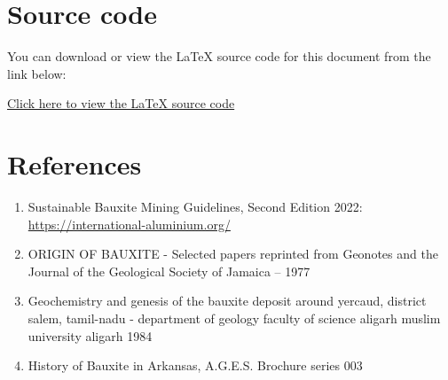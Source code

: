 \documentclass[12pt,a4paper, top=1.9cm, bottom=2.03cm, left=3.81cm, right=1.9cm]{article}
\begin{document}
\section{Source code}
You can download or view the LaTeX source code for this document from the link below:
\vspace{0.5cm}

\noindent\fontsize{12}{14}\selectfont \textcolor{blue} { \href{https://github.com/Sachin-mihijaya/Mineral-technology-assignment-03/blob/main/Mineral.tex}{Click here to view the LaTeX source code}
}
\newpage
\section{References}
{\selectfont
\begin{enumerate}
    \item \raggedright Sustainable Bauxite Mining Guidelines, Second Edition 2022:
    \url{https://international-aluminium.org/}
    
    \item ORIGIN OF BAUXITE - Selected papers reprinted from Geonotes and the Journal of the Geological Society of Jamaica – 1977

    \item Geochemistry and genesis of the bauxite deposit around yercaud, district salem, tamil-nadu - department of geology faculty of science aligarh muslim university aligarh 1984

    \item History of Bauxite in Arkansas, A.G.E.S. Brochure series 003


\end{enumerate}}
\end{document}
